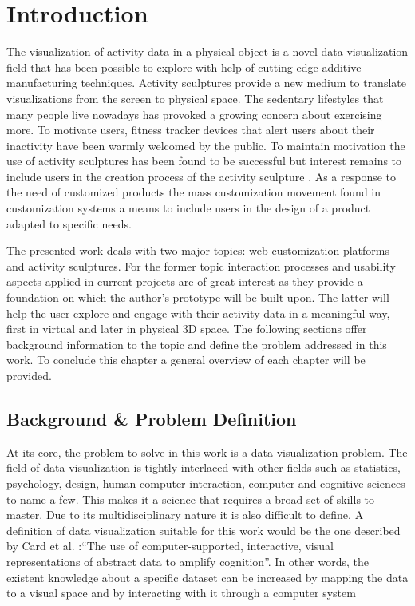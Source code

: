 \documentclass[../medieninformatik-arbeit.tex]{subfiles}
\begin{document}
\section{Introduction}
\label{ch:intro}
The visualization of activity data in a physical object is a novel data visualization field that has been possible to explore with help of cutting edge additive manufacturing techniques. Activity sculptures provide a new medium to translate visualizations from the screen to physical space. The sedentary lifestyles that many people live nowadays has provoked a growing concern about exercising more. To motivate users, fitness tracker devices that alert users about their inactivity have been warmly welcomed by the public. To maintain motivation the use of activity sculptures has been found to be successful but interest remains to include users in the creation process of the activity sculpture \cite{stusak2014activity}. As a response to the need of customized products the mass customization movement found in customization systems a means to include users in the design of a product adapted to specific needs. 

The presented work deals with two major topics: web customization platforms and
activity sculptures. For the former topic interaction processes and usability aspects
applied in current projects are of great interest as they provide a foundation on
which the author's prototype will be built upon. The latter will help the user
explore and engage with their activity data in a meaningful way, first in virtual and later in physical 3D space. The following sections offer background information to the topic and define the problem addressed in this work. To conclude this chapter a general
overview of each chapter will be provided.

\subsection{Background \& Problem Definition}
At its core, the problem to solve in this work is a data visualization problem.
The field of data visualization is tightly interlaced with other fields such as
statistics, psychology, design, human-computer interaction, computer and cognitive
sciences to name a few. This makes it a science that requires a broad set of
skills to master. Due to its multidisciplinary nature it is also difficult to
define. A definition of data visualization suitable for this work would be the
one described by Card et al. \cite{Card:1999:RIV:300679}:``The use of
computer-supported, interactive, visual representations of abstract data to
amplify cognition''. In other words, the existent knowledge about a specific dataset can be increased by mapping the data to a visual space and
by interacting with it through a computer system 
\end{document}

